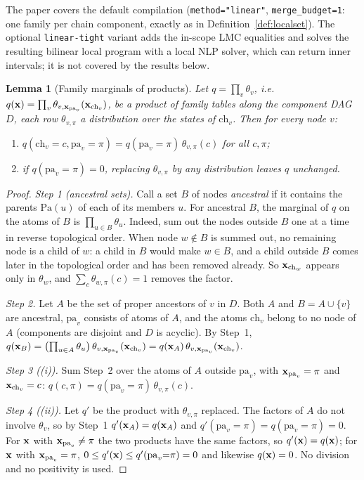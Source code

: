 \documentclass{article} %
\newtheorem{lemma}{Lemma}
\newcommand{\ch}{\mathrm{ch}}
\newcommand{\pa}{\mathrm{pa}}
\providecommand{\Pa}{\mathrm{Pa}}
\begin{document}
The paper covers the default compilation (\texttt{method="linear"}, \texttt{merge\_budget=1}: one
family per chain component, exactly as in Definition~\ref{def:localset}). The optional
\texttt{linear-tight} variant adds the in-scope LMC equalities and solves the resulting bilinear local
program with a local NLP solver, which can return inner intervals; it is not covered by the results
below.

\begin{lemma}[Family marginals of products]\label{lem:marg}
Let $q=\prod_v\theta_v$, i.e.\ $q(\bx)=\prod_v\theta_{v,\bx_{\pa_v}}(\bx_{\ch_v})$, be a product of
family tables along the component DAG $D$, each row $\theta_{v,\pi}$ a distribution over the states
of $\ch_v$. Then for every node $v$:
\begin{enumerate}
  \item[\textup{(i)}] $q(\ch_v{=}c,\pa_v{=}\pi)=q(\pa_v{=}\pi)\,\theta_{v,\pi}(c)$ for all $c,\pi$;
  \item[\textup{(ii)}] if $q(\pa_v{=}\pi)=0$, replacing $\theta_{v,\pi}$ by any distribution leaves $q$
    unchanged.
\end{enumerate}
\end{lemma}

\begin{proof}
\emph{Step 1 (ancestral sets).} Call a set $B$ of nodes \emph{ancestral} if it contains the parents
$\Pa(u)$ of each of its members $u$. For ancestral $B$, the marginal of $q$ on the atoms of $B$ is
$\prod_{u\in B}\theta_u$. Indeed, sum out the nodes outside $B$ one at a time in reverse topological
order. When node $w\notin B$ is summed out, no remaining node is a child of $w$: a child in $B$ would
make $w\in B$, and a child outside $B$ comes later in the topological order and has been removed
already. So $\bx_{\ch_w}$ appears only in $\theta_w$, and
$\sum_{c}\theta_{w,\pi}(c)=1$ removes the factor.

\emph{Step 2.} Let $A$ be the set of proper ancestors of $v$ in $D$. Both $A$ and $B=A\cup\{v\}$ are
ancestral, $\pa_v$ consists of atoms of $A$, and the atoms $\ch_v$ belong to no node of $A$ (components
are disjoint and $D$ is acyclic). By Step~1,
$q(\bx_B)=\bigl(\prod_{u\in A}\theta_u\bigr)\,\theta_{v,\bx_{\pa_v}}(\bx_{\ch_v})
=q(\bx_A)\,\theta_{v,\bx_{\pa_v}}(\bx_{\ch_v})$.

\emph{Step 3 ((i)).} Sum Step~2 over the atoms of $A$ outside $\pa_v$, with $\bx_{\pa_v}=\pi$ and
$\bx_{\ch_v}=c$: $q(c,\pi)=q(\pa_v{=}\pi)\,\theta_{v,\pi}(c)$.

\emph{Step 4 ((ii)).} Let $q'$ be the product with $\theta_{v,\pi}$ replaced. The factors of $A$ do not
involve $\theta_v$, so by Step~1 $q'(\mathbf{x}_A)=q(\mathbf{x}_A)$ and $q'(\pa_v{=}\pi)=q(\pa_v{=}\pi)=0$. For
$\mathbf{x}$ with $\bx_{\pa_v}\ne\pi$ the two products have the same factors, so $q'(\mathbf{x})=q(\mathbf{x})$; for
$\mathbf{x}$ with $\bx_{\pa_v}=\pi$, $0\le q'(\bx)\le q'(\pa_v{=}\pi)=0$ and likewise $q(\mathbf{x})=0$. No
division and no positivity is used.
\end{proof}
\end{document}
